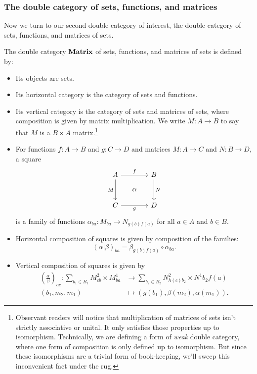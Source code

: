 \documentclass[DynamicalBook]{subfiles}
\begin{document}
\subsubsection{The double category of sets, functions, and matrices}\label{sec.double_cat_of_matrices}

Now we turn to our second double category of interest, the double category of
sets, functions, and matrices of sets.
\begin{definition}\label{def.double_cat_of_matrices}
  The double category $\textbf{Matrix}$ of sets, functions, and matrices of sets
  is defined by:
  \begin{itemize}
    \item Its objects are sets.
    \item Its horizontal category is the category of sets and functions.
    \item Its vertical category is the category of sets and matrices of sets,
      where composition is given by matrix multiplication. We write $M : A
      \to B$ to say that $M$ is a $B \times A$ matrix.\footnote{Observant
        readers will notice that multiplication of matrices of sets isn't
        strictly associative or unital. It only satisfies those properties up to
      isomorphism. Technically, we are defining a form of \emph{weak} double
      category, where one form of composition is only defined up to isomorphism.
    But since these isomorphisms are a trivial form of book-keeping, we'll sweep
    this inconvenient fact under the rug.}
     \item For functions $f : A \to B$ and $g : C \to D$ and matrices $M : A
       \to C$ and $N : B \to D$, a square
       \[
        \begin{tikzcd}[sep=small]
          A \ar[dd, "M"'] \ar[rr, "f"] & & B \ar[dd, "N"] \\
           & \alpha & \\
          C \ar[rr, "g"'] & & D
        \end{tikzcd}
       \]
       is a family of functions $\alpha_{ba} : M_{ba} \to N_{g(b)f(a)}$ for all
       $a \in A$ and $b \in B$.
     \item Horizontal composition of squares is given by composition of the
       families:
       $$(\alpha | \beta)_{ba} = \beta_{g(b)f(a)} \circ \alpha_{ba}.$$
     \item Vertical composition of squares is given by
       \begin{align*}
         \left( \frac{\alpha}{\beta} \right)_{ac} : \sum_{b_1 \in B_1} M^2_{cb} \times M^1_{ba} &\to \sum_{b_2 \in B_2} N^2_{h(c)b_2} \times N^1{b_2f(a)} \\
         (b_1, m_2, m_1) &\mapsto (g(b_1), \beta(m_2), \alpha(m_1)).
       \end{align*}
  \end{itemize}
\end{definition}
\end{document}
